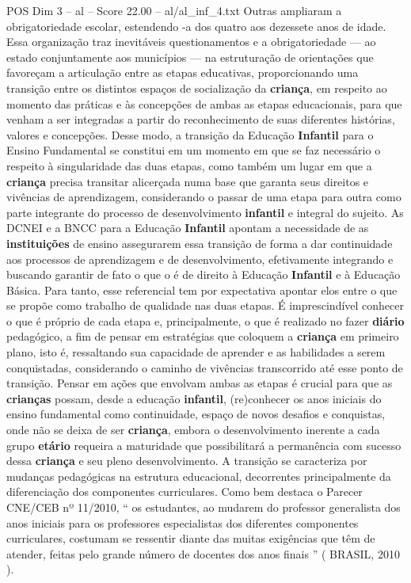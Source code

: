 \begin{textsample}{POS Dim 3 – al – Score 22.00 – al/al\_inf\_4.txt}
Outras ampliaram a obrigatoriedade escolar, estendendo -a dos quatro aos dezessete anos de idade.
Essa organização traz inevitáveis questionamentos e a obrigatoriedade — ao estado conjuntamente aos municípios — na estruturação de orientações que favoreçam a articulação entre as etapas educativas, proporcionando uma transição entre os distintos espaços de socialização da \textbf{criança}, em respeito ao momento das práticas e às concepções de ambas as etapas educacionais, para que venham a ser integradas a partir do reconhecimento de suas diferentes histórias, valores e concepções.
Desse modo, a transição da Educação \textbf{Infantil} para o Ensino Fundamental se constitui em um momento em que se faz necessário o respeito à singularidade das duas etapas, como também um lugar em que a \textbf{criança} precisa transitar alicerçada numa base que garanta seus direitos e vivências de aprendizagem, considerando o passar de uma etapa para outra como parte integrante do processo de desenvolvimento \textbf{infantil} e integral do sujeito.
As DCNEI e a BNCC para a Educação \textbf{Infantil} apontam a necessidade de as \textbf{instituições} de ensino assegurarem essa transição de forma a dar continuidade aos processos de aprendizagem e de desenvolvimento, efetivamente integrando e buscando garantir de fato o que o é de direito à Educação \textbf{Infantil} e à Educação Básica.
Para tanto, esse referencial tem por expectativa apontar elos entre o que se propõe como trabalho de qualidade nas duas etapas.
É imprescindível conhecer o que é próprio de cada etapa e, principalmente, o que é realizado no fazer \textbf{diário} pedagógico, a fim de pensar em estratégias que coloquem a \textbf{criança} em primeiro plano, isto é, ressaltando sua capacidade de aprender e as habilidades a serem conquistadas, considerando o caminho de vivências transcorrido até esse ponto de transição.
Pensar em ações que envolvam ambas as etapas é crucial para que as \textbf{crianças} possam, desde a educação \textbf{infantil}, (re)conhecer os anos iniciais do ensino fundamental como continuidade, espaço de novos desafios e conquistas, onde não se deixa de ser \textbf{criança}, embora o desenvolvimento inerente a cada grupo \textbf{etário} requeira a maturidade que possibilitará a permanência com sucesso dessa \textbf{criança} e seu pleno desenvolvimento.
A transição se caracteriza por mudanças pedagógicas na estrutura educacional, decorrentes principalmente da diferenciação dos componentes curriculares.
Como bem destaca o Parecer CNE/CEB nº 11/2010, “ os estudantes, ao mudarem do professor generalista dos anos iniciais para os professores especialistas dos diferentes componentes curriculares, costumam se ressentir diante das muitas exigências que têm de atender, feitas pelo grande número de docentes dos anos finais ” ( BRASIL, 2010 ).

\end{textsample}
